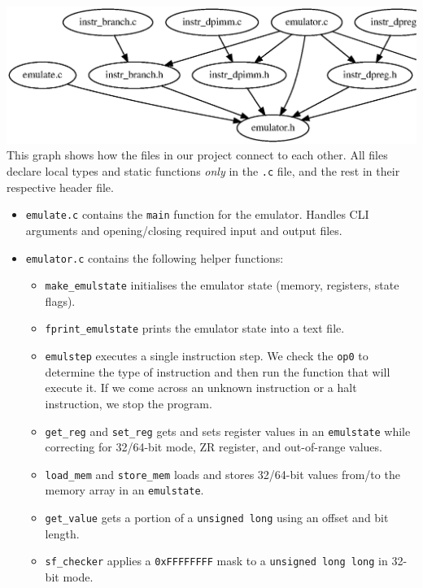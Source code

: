 \documentclass[11pt]{article}
\begin{document}
\includegraphics[width=\textwidth]{incgraph_emulate.eps}
This graph shows how the files in our project connect to each other. All files declare local types and static functions \textit{only} in the \verb|.c| file, and the rest in their respective header file.

\begin{itemize}
    
    \item \verb|emulate.c| contains the \verb|main| function for the emulator. Handles CLI arguments and opening/closing required input and output files.

    \item \verb|emulator.c| contains the following helper functions:
    \begin{itemize}
        \item \verb|make_emulstate| initialises the emulator state (memory, registers, state flags).
        \item \verb|fprint_emulstate| prints the emulator state into a text file.
        \item \verb|emulstep| executes a single instruction step. We check the \verb|op0| to determine the type of instruction and then run the function that will execute it. If we come across an unknown instruction or a halt instruction, we stop the program.
        \item \verb|get_reg| and \verb|set_reg| gets and sets register values in an \verb|emulstate| while correcting for 32/64-bit mode, ZR register, and out-of-range values.
        \item \verb|load_mem| and \verb|store_mem| loads and stores 32/64-bit values from/to the memory array in an \verb|emulstate|.
        \item \verb|get_value| gets a portion of a \verb|unsigned long| using an offset and bit length.
        \item \verb|sf_checker| applies a \verb|0xFFFFFFFF| mask to a \verb|unsigned long long| in 32-bit mode.
    \end{itemize}


\end{itemize}
\end{document}
